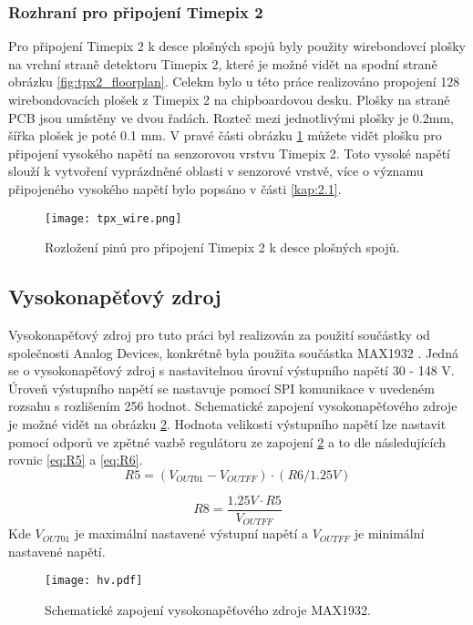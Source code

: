 	\subsubsection{Rozhraní pro připojení Timepix 2}	%
	Pro připojení Timepix 2 k desce plošných spojů byly použity wirebondovcí plošky na vrchní straně detektoru Timepix 2, které je možné vidět na spodní straně obrázku \ref{fig:tpx2_floorplan}. Celekm bylo u této práce realizováno propojení 128 wirebondovacích plošek z Timepix 2 na chipboardovou desku. Plošky na straně PCB jsou umístěny ve dvou řadách. Rozteč mezi jednotlivými plošky je 0.2mm, šířka plošek je poté 0.1 mm. V pravé části obrázku \ref{fig:tpx_wire} můžete vidět plošku pro připojení vysokého napětí na senzorovou vrstvu Timepix 2. Toto vysoké napětí slouží k vytvoření vyprázdněné oblasti v senzorové vrstvě, více o významu připojeného vysokého napětí bylo popsáno v části \ref{kap:2.1}. 
	\begin{figure}[h!]
		\centering
		\captionsetup{justification=centering}
		\texttt{[image: tpx\_wire.png]}
		\caption{Rozložení pinů pro připojení Timepix 2 k desce plošných spojů.} 
		\label{fig:tpx_wire}
	\end{figure} 
	\subsection{Vysokonapěťový zdroj}	%
	\label{VN zdroj}
	Vysokonapěťový zdroj pro tuto práci byl realizován za použití součástky od společnosti Analog Devices, konkrétně byla použita součástka MAX1932 \cite{MAX1932}. Jedná se o vysokonapěťový zdroj s nastavitelnou úrovní výstupního napětí 30 - 148 V. Úroveň výstupního napětí se nastavuje pomocí SPI komunikace v uvedeném rozsahu s rozlišením 256 hodnot. Schematické zapojení vysokonapěťového zdroje je možné vidět na obrázku \ref{fig:hv}. Hodnota velikosti výstupního napětí lze nastavit pomocí odporů ve zpětné vazbě regulátoru ze zapojení \ref{fig:hv} a to dle následujících rovnic \ref{eq:R5} a \ref{eq:R6}. 
	\begin{equation}
		R5 = (V_{OUT01} - V_{OUTFF})\cdot (R6/1.25V)
		\label{eq:R5}
	\end{equation}

	\begin{equation}
		R8 = \frac{1.25V \cdot R5}{V_{OUTFF}}
		\label{eq:R6}
	\end{equation}
	Kde $V_{OUT01}$ je maximální nastavené výstupní napětí a $V_{OUTFF}$ je minimální nastavené napětí. 
	\begin{figure}[h!]
		\centering
		\captionsetup{justification=centering}
		\texttt{[image: hv.pdf]}
		\caption{Schematické zapojení vysokonapěťového zdroje MAX1932.} 
		\label{fig:hv}
	\end{figure} 
